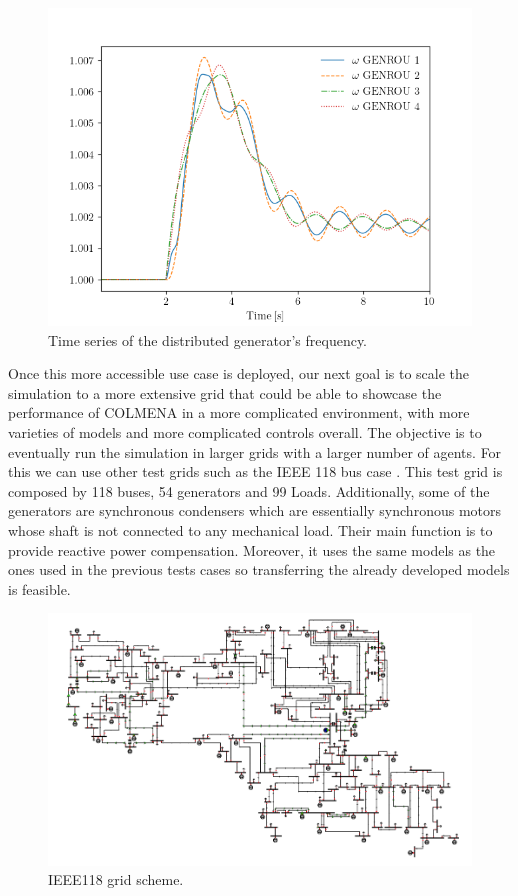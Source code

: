\documentclass{article}
\begin{document}
\begin{figure}[h]  %
    \centering
    \includegraphics[width=1\textwidth]{pictures/plot.png}

    \caption{Time series of the distributed generator's frequency.}
    \label{fig:sample_figure2}
\end{figure}

Once this more accessible use case is deployed, our next goal is to scale the simulation to a more extensive grid that could be able to showcase the performance of COLMENA in a more complicated environment, with more varieties of models and more complicated controls overall. The objective is to eventually run the simulation in larger grids with a larger number of agents. For this we can use other test grids such as the IEEE 118 bus case \cite{grids:ieee118}. This test grid is composed by 118 buses, 54 generators and 99 Loads. Additionally, some of the generators are synchronous condensers which are essentially synchronous motors whose shaft is not connected to any mechanical load. Their main function is to provide reactive power compensation. Moreover, it uses the same models as the ones used in the previous tests cases so transferring the already developed models is feasible.

\begin{figure}[h!]
    \centering
    \includegraphics[width=1\textwidth]{pictures/IEEE118.png}
    \caption{IEEE118 grid scheme. \cite{grids:ieee118}}
    \label{fig:kundur}
\end{figure}
\end{document}
